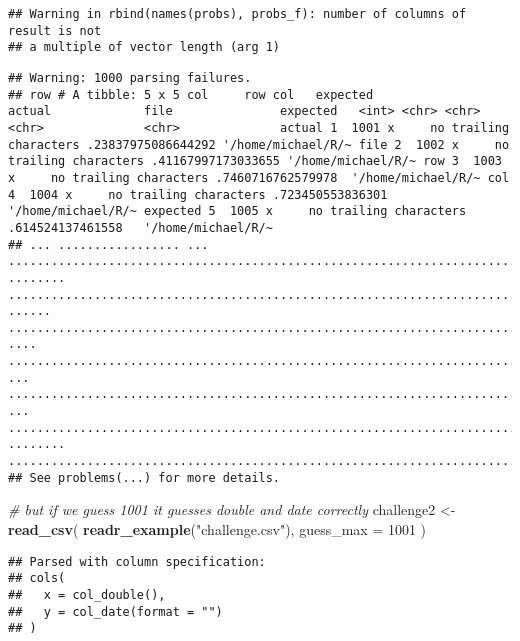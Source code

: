 \documentclass[]{article}
\newenvironment{Shaded}{\begin{snugshade}}{\end{snugshade}}
\newcommand{\KeywordTok}[1]{\textcolor[rgb]{0.13,0.29,0.53}{\textbf{#1}}}
\newcommand{\DataTypeTok}[1]{\textcolor[rgb]{0.13,0.29,0.53}{#1}}
\newcommand{\DecValTok}[1]{\textcolor[rgb]{0.00,0.00,0.81}{#1}}
\newcommand{\StringTok}[1]{\textcolor[rgb]{0.31,0.60,0.02}{#1}}
\newcommand{\CommentTok}[1]{\textcolor[rgb]{0.56,0.35,0.01}{\textit{#1}}}
\newcommand{\NormalTok}[1]{#1}
\begin{document}
\begin{verbatim}
## Warning in rbind(names(probs), probs_f): number of columns of result is not
## a multiple of vector length (arg 1)
\end{verbatim}

\begin{verbatim}
## Warning: 1000 parsing failures.
## row # A tibble: 5 x 5 col     row col   expected               actual             file               expected   <int> <chr> <chr>                  <chr>              <chr>              actual 1  1001 x     no trailing characters .23837975086644292 '/home/michael/R/~ file 2  1002 x     no trailing characters .41167997173033655 '/home/michael/R/~ row 3  1003 x     no trailing characters .7460716762579978  '/home/michael/R/~ col 4  1004 x     no trailing characters .723450553836301   '/home/michael/R/~ expected 5  1005 x     no trailing characters .614524137461558   '/home/michael/R/~
## ... ................. ... .......................................................................... ........ .......................................................................... ...... .......................................................................... .... .......................................................................... ... .......................................................................... ... .......................................................................... ........ ..........................................................................
## See problems(...) for more details.
\end{verbatim}

\begin{Shaded}
\begin{Highlighting}[]
\CommentTok{# but if we guess 1001 it guesses double and date correctly }
\NormalTok{challenge2 <-}\StringTok{ }\KeywordTok{read_csv}\NormalTok{(}
  \KeywordTok{readr_example}\NormalTok{(}\StringTok{"challenge.csv"}\NormalTok{), }
  \DataTypeTok{guess_max =} \DecValTok{1001}
\NormalTok{)}
\end{Highlighting}
\end{Shaded}

\begin{verbatim}
## Parsed with column specification:
## cols(
##   x = col_double(),
##   y = col_date(format = "")
## )
\end{verbatim}
\end{document}
